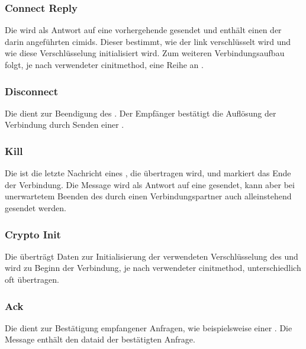 \bmcpconnectreqbytefield


\subsubsection*{Connect Reply}
\label{dcl-bmcp-connectrep}
Die \msg{\bmcpconnectrep} wird als Antwort auf eine vorhergehende
\msg{\bmcpconnectreq} gesendet und enthält einen der darin angeführten
\glspl{cimid}.
Dieser bestimmt, wie der \gls{link} verschlüsselt wird und wie diese
Verschlüsselung initialisiert wird.
Zum weiteren Verbindungsaufbau folgt, je nach verwendeter \gls{cinitmethod},
eine Reihe an \msgpl{\bmcpcryptoinit}.

\bmcpconnectrepbytefield


\subsubsection*{Disconnect}
\label{dcl-bmcp-disconnect}
Die \msg{\bmcpdisconnect} dient zur Beendigung des .
Der Empfänger bestätigt die Auflösung der Verbindung durch Senden einer
\msg{\bmcpkill}.

\bmcpdisconnectbytefield


\subsubsection*{Kill}
\label{dcl-bmcp-kill}
Die \msg{\bmcpkill} ist die letzte Nachricht eines , die
übertragen wird, und markiert das Ende der Verbindung.
Die Message wird als Antwort auf eine \msg{\bmcpdisconnect} gesendet, kann aber
bei unerwartetem Beenden des  durch einen
Verbindungspartner auch alleinstehend gesendet werden.

\bmcpkillbytefield


\subsubsection*{Crypto Init}
\label{dcl-bmcp-cryptoinit}
Die \msg{\bmcpcryptoinit} überträgt Daten zur Initialisierung der verwendeten
Verschlüsselung des  und wird zu Beginn der Verbindung, je
nach verwendeter \gls{cinitmethod}, unterschiedlich oft übertragen.

\bmcpcryptoinitbytefield


\subsubsection*{Ack}
\label{dcl-bmcp-ack}
Die \msg{\bmcpack} dient zur Bestätigung empfangener Anfragen, wie
beispielsweise einer \msg{\bmcpopenchreq}.
Die Message enthält den \gls{dataid} der bestätigten Anfrage.


